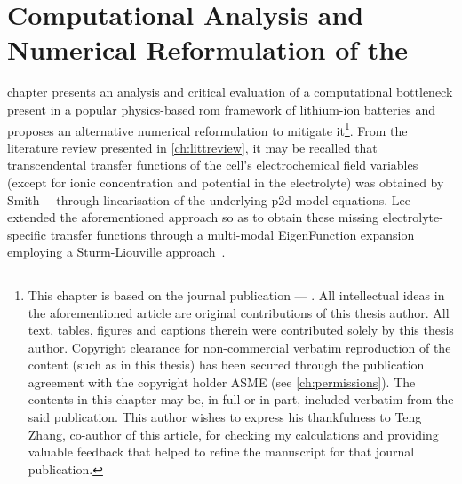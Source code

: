 
\graphicspath{{chapters/dra/figures/}}

\chapter{Computational Analysis and Numerical Reformulation of the }\label{ch:improveddra}
\vspace*{-1em}
\startcontents[chapters]


 chapter presents  an analysis and critical  evaluation of a
computational bottleneck present in  a popular physics-based \gls{rom} framework
of lithium-ion batteries and proposes  an alternative numerical reformulation to
mitigate  it\footnote{This  chapter is  based  on  the journal  publication  ---
.  All  intellectual  ideas in  the  aforementioned
article  are original  contributions of  this thesis  author. All  text, tables,
figures  and captions  therein were  contributed solely  by this  thesis author.
Copyright  clearance for  non-commercial  verbatim reproduction  of the  content
(such as in this thesis) has been secured through the publication agreement with
the  copyright holder  ASME (see  \cref{ch:permissions}). The  contents in  this
chapter may be, in full or in part, included verbatim from the said publication.
This  author wishes  to express  his thankfulness  to Teng  Zhang, co-author  of
this  article, for  checking  my calculations  and  providing valuable  feedback
that  helped to  refine  the  manuscript for  that  journal publication.}.  From
the  literature review  presented in  \cref{ch:littreview}, it  may be  recalled
that  transcendental  transfer functions  of  the  cell's electrochemical  field
variables  (except for  ionic concentration  and potential  in the  electrolyte)
was  obtained  by  Smith~\etal~\cite{Smith2007}  through  linearisation  of  the
underlying \gls{p2d} model equations. Lee~\etal~\cite{Lee2012a,Lee2012} extended
the aforementioned approach  so as to obtain  these missing electrolyte-specific
transfer  functions through  a multi-modal  EigenFunction expansion  employing a
Sturm-Liouville approach~\cite{Pryce1993}.


